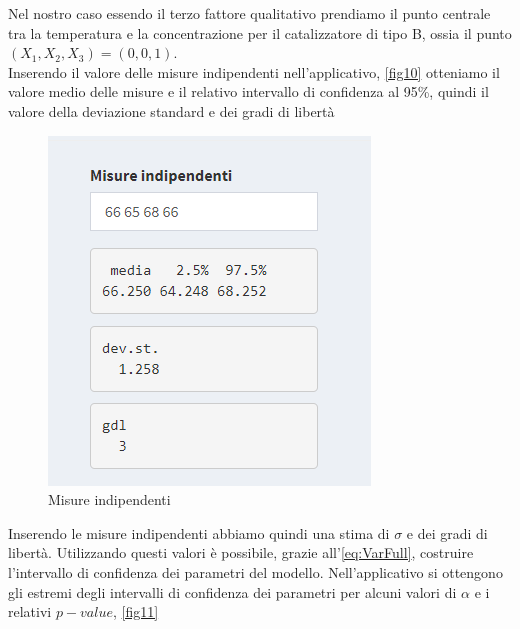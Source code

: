 \documentclass[
]{book}
\begin{document}
Nel nostro caso essendo il terzo fattore qualitativo prendiamo il punto centrale tra la temperatura e la concentrazione per il catalizzatore di tipo B, ossia il punto \((X_1,X_2,X_3)=(0,0,1)\).\\
Inserendo il valore delle misure indipendenti nell'applicativo, \autoref{fig10} otteniamo il valore medio delle misure e il relativo intervallo di confidenza al 95\%, quindi il valore della deviazione standard e dei gradi di libertà

\begin{figure}

{\centering \includegraphics[width=1\linewidth]{Immagini/10_mis_ind} 

}

\caption{Misure indipendenti \label{fig10}}\label{fig:unnamed-chunk-14}
\end{figure}

Inserendo le misure indipendenti abbiamo quindi una stima di \(\sigma\) e dei gradi di libertà. Utilizzando questi valori è possibile, grazie all'\autoref{eq:VarFull}, costruire l'intervallo di confidenza dei parametri del modello. Nell'applicativo si ottengono gli estremi degli intervalli di confidenza dei parametri per alcuni valori di \(\alpha\) e i relativi \(p-value\), \autoref{fig11}
\end{document}
